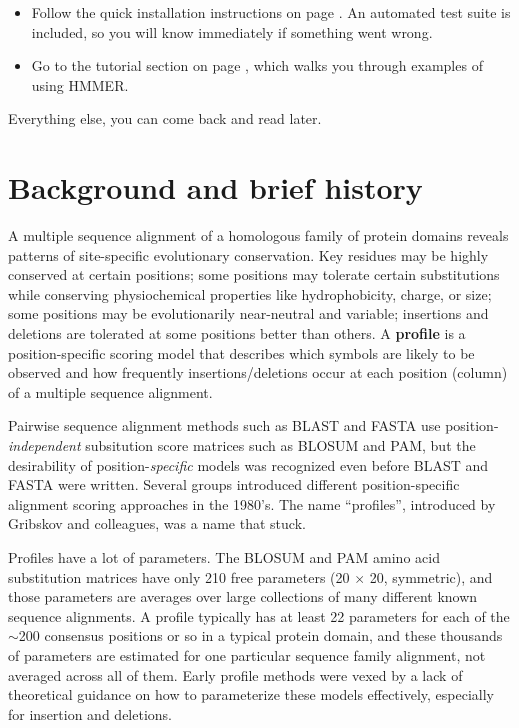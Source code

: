 \begin{itemize}

\item Follow the quick installation instructions on page
  \pageref{chapter:installation}. An automated test suite is included,
  so you will know immediately if something went
  wrong.

\item Go to the tutorial section on page \pageref{chapter:tutorial},
  which walks you through examples of using HMMER.

\end{itemize}

Everything else, you can come back and read later.



\section{Background and brief history}

A multiple sequence alignment of a homologous family of protein
domains reveals patterns of site-specific evolutionary
conservation. Key residues may be highly conserved at certain
positions; some positions may tolerate certain substitutions while
conserving physiochemical properties like hydrophobicity, charge, or
size; some positions may be evolutionarily near-neutral and variable;
insertions and deletions are tolerated at some positions better than
others.  A \textbf{profile} is a position-specific scoring model that
describes which symbols are likely to be observed and how frequently
insertions/deletions occur at each position (column) of a multiple
sequence alignment.

Pairwise sequence alignment methods such as BLAST and FASTA use
position-\emph{independent} subsitution score matrices such as BLOSUM
and PAM, but the desirability of position-\emph{specific} models was
recognized even before BLAST and FASTA were written.\cite{Doolittle81}
Several groups introduced different position-specific alignment
scoring approaches in the 1980's. The name ``profiles'', introduced by
Gribskov and colleagues,\cite{Gribskov87} was a name that stuck.

Profiles have a lot of parameters.  The BLOSUM and PAM amino acid
substitution matrices have only 210 free parameters (20 $\times$ 20,
symmetric), and those parameters are averages over large collections
of many different known sequence alignments. A profile typically has
at least 22 parameters  for each of the $\sim$200 consensus positions or so in a
typical protein domain, and these thousands of parameters are
estimated for one particular sequence family alignment, not averaged
across all of them. Early profile methods were vexed by a lack of
theoretical guidance on how to parameterize these models effectively,
especially for insertion and deletions.

